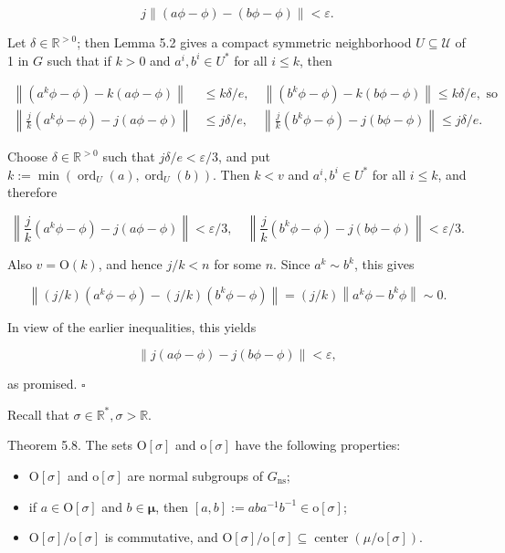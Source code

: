 \documentclass[10pt]{article}
\begin{document}
$$
j\|(a \phi-\phi)-(b \phi-\phi)\|<\varepsilon .
$$

Let $\delta \in \mathbb{R}^{>0}$; then Lemma 5.2 gives a compact symmetric neighborhood $U \subseteq \mathcal{U}$ of 1 in $G$ such that if $k>0$ and $a^{i}, b^{i} \in U^{*}$ for all $i \leq k$, then

$$
\begin{aligned}
\left\|\left(a^{k} \phi-\phi\right)-k(a \phi-\phi)\right\| & \leq k \delta / e, \quad\left\|\left(b^{k} \phi-\phi\right)-k(b \phi-\phi)\right\| \leq k \delta / e, \text { so } \\
\left\|\frac{j}{k}\left(a^{k} \phi-\phi\right)-j(a \phi-\phi)\right\| & \leq j \delta / e, \quad\left\|\frac{j}{k}\left(b^{k} \phi-\phi\right)-j(b \phi-\phi)\right\| \leq j \delta / e .
\end{aligned}
$$

Choose $\delta \in \mathbb{R}^{>0}$ such that $j \delta / e<\varepsilon / 3$, and put $k:=\min \left(\operatorname{ord}_{U}(a), \operatorname{ord}_{U}(b)\right)$. Then $k<v$ and $a^{i}, b^{i} \in U^{*}$ for all $i \leq k$, and therefore

$$
\left\|\frac{j}{k}\left(a^{k} \phi-\phi\right)-j(a \phi-\phi)\right\|<\varepsilon / 3, \quad\left\|\frac{j}{k}\left(b^{k} \phi-\phi\right)-j(b \phi-\phi)\right\|<\varepsilon / 3 .
$$

Also $v=\mathrm{O}(k)$, and hence $j / k<n$ for some $n$. Since $a^{k} \sim b^{k}$, this gives

$$
\left\|(j / k)\left(a^{k} \phi-\phi\right)-(j / k)\left(b^{k} \phi-\phi\right)\right\|=(j / k)\left\|a^{k} \phi-b^{k} \phi\right\| \sim 0 .
$$

In view of the earlier inequalities, this yields

$$
\|j(a \phi-\phi)-j(b \phi-\phi)\|<\varepsilon,
$$

as promised. \(\square\)

Recall that $\sigma \in \mathbb{R}^{*}, \sigma>\mathbb{R}$.

Theorem 5.8. The sets $\mathrm{O}[\sigma]$ and $\mathrm{o}[\sigma]$ have the following properties:

\begin{itemize}
  \item[(1)] $\mathrm{O}[\sigma]$ and $\mathrm{o}[\sigma]$ are normal subgroups of $G_{\mathrm{ns}}$;
  \item[(2)] if $a \in \mathrm{O}[\sigma]$ and $b \in \boldsymbol{\mu}$, then $[a, b]:=a b a^{-1} b^{-1} \in \mathrm{o}[\sigma]$;
  \item[(3)] $\mathrm{O}[\sigma] / \mathrm{o}[\sigma]$ is commutative, and $\mathrm{O}[\sigma] / \mathrm{o}[\sigma] \subseteq \operatorname{center}(\mu / \mathrm{o}[\sigma])$.
\end{itemize}
\end{document}
